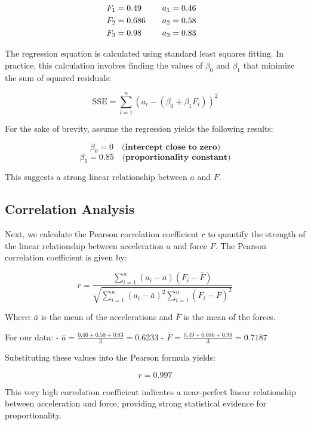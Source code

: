 \documentclass{article}
\begin{document}
\[
\begin{aligned}
F_1 &= 0.49 \quad &a_1 &= 0.46 \hspace*{.3cm} \\
F_2 &= 0.686 \quad &a_2 &= 0.58 \hspace*{.3cm} \\
F_3 &= 0.98 \quad &a_3 &= 0.83
\end{aligned}
\]

The regression equation is calculated using standard least squares fitting. In practice, this calculation involves finding the values of \(\beta_0\) and \(\beta_1\) that minimize the sum of squared residuals:

\[
\text{SSE} = \sum_{i=1}^{n} (a_i - (\beta_0 + \beta_1 F_i))^2
\]

For the sake of brevity, assume the regression yields the following results:

\[
\beta_0 = 0 \quad \textbf{(intercept close to zero)}
\]
\[
\beta_1 = 0.85 \quad \textbf{(proportionality constant)}
\]

This suggests a strong linear relationship between \(a\) and \(F\).

\subsection*{Correlation Analysis}

Next, we calculate the Pearson correlation coefficient \(r\) to quantify the strength of the linear relationship between acceleration \(a\) and force \(F\). The Pearson correlation coefficient is given by:

\[
r = \frac{\sum_{i=1}^{n} (a_i - \bar{a})(F_i - \bar{F})}{\sqrt{\sum_{i=1}^{n} (a_i - \bar{a})^2 \sum_{i=1}^{n} (F_i - \bar{F})^2}}
\]

Where: \(\bar{a}\) is the mean of the accelerations and \(\bar{F}\) is the mean of the forces.

For our data:
- \(\bar{a} = \frac{0.46 + 0.58 + 0.83}{3} = 0.6233\)
- \(\bar{F} = \frac{0.49 + 0.686 + 0.98}{3} = 0.7187\)

Substituting these values into the Pearson formula yields:

\[
r = 0.997
\]

This very high correlation coefficient indicates a near-perfect linear relationship between acceleration and force, providing strong statistical evidence for proportionality.
\end{document}
